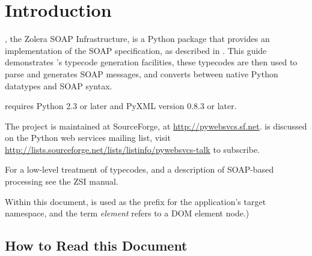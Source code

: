 \chapter{Introduction}

\ZSI{}, the Zolera SOAP Infrastructure, is a Python package that
provides an implementation of the SOAP specification, as described in
.
This guide demonstrates \ZSI{}'s typecode generation facilities, these
typecodes are then used to parse and generates SOAP messages, and
converts between native Python datatypes and SOAP syntax.

 requires Python 2.3 or later and PyXML version 0.8.3 or later.

The  project is maintained at SourceForge, at
\url{http://pywebsvcs.sf.net}.
\ZSI{} is discussed on the Python web services mailing list, visit
\url{http://lists.sourceforge.net/lists/listinfo/pywebsvcs-talk}
to subscribe.

For a low-level treatment of typecodes, and a description of SOAP-based 
processing see the ZSI manual.

Within this document,  is used as the prefix for the
application's target namespace, and the term
\emph{element} refers to a DOM element node.)

\section{How to Read this Document}


